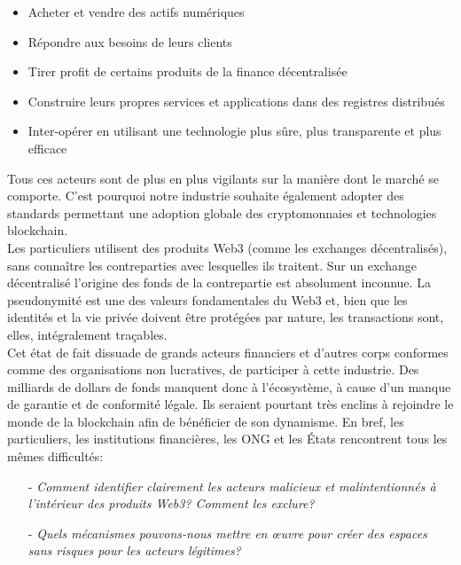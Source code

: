 ﻿\documentclass[a4paper]{article}
\begin{document}
\begin{itemize}
\item Acheter et vendre des actifs numériques
\item Répondre aux besoins de leurs clients
\item Tirer profit de certains produits de la finance décentralisée 
\item Construire leurs propres services et applications dans des registres distribués 
\item Inter-opérer en utilisant une technologie plus sûre, plus transparente et plus efficace
\end{itemize}
Tous ces acteurs sont de plus en plus vigilants sur la manière dont le marché se comporte. C’est pourquoi notre industrie souhaite également adopter des standards permettant une adoption globale des cryptomonnaies et technologies blockchain.  \\

Les particuliers utilisent des produits Web3 (comme les exchanges décentralisés), sans connaître les contreparties avec lesquelles ils traitent. Sur un exchange décentralisé l’origine des fonds de la contrepartie est absolument inconnue. La pseudonymité est une des valeurs fondamentales du Web3 et, bien que les identités et la vie privée doivent être  protégées par nature, les transactions sont, elles, intégralement traçables. \\

Cet état de fait dissuade de grands acteurs financiers et d’autres corps conformes comme des organisations non lucratives, de participer à cette industrie. Des milliards de dollars de fonds manquent donc à l'écosystème, à cause d’un manque de garantie et de conformité légale. Ils seraient pourtant très enclins à rejoindre le monde de la blockchain afin de bénéficier de son dynamisme. En bref, les particuliers, les institutions financières, les ONG et les États rencontrent tous les mêmes difficultés: 

\begin{itemize}
\item[-] {\it Comment identifier clairement les acteurs malicieux et malintentionnés à l’intérieur des produits Web3? Comment les exclure?}

\item[-] {\it Quels mécanismes pouvons-nous mettre en œuvre pour créer des espaces sans risques pour les acteurs légitimes?}
\end{itemize}
\end{document}
